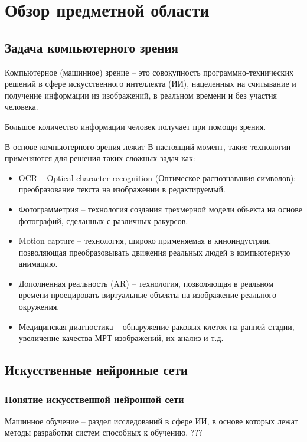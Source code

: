 \section{Обзор предметной области}
\subsection{Задача компьютерного зрения}
Компьютерное (машинное) зрение – это совокупность программно-технических решений в сфере искусственного интеллекта (ИИ), нацеленных на считывание и получение информации из изображений, в реальном времени и без участия человека. 

Большое количество информации человек получает при помощи зрения. 

В основе компьютерного зрения лежит 
В настоящий момент, такие технологии применяются для решения таких сложных задач как:
\begin{itemize}
    \item OCR – Optical character recognition (Оптическое распознавания символов): преобразование текста на изображении в редактируемый.
    \item Фотограмметрия – технология создания трехмерной модели объекта на основе фотографий, сделанных с различных ракурсов.
    \item Motion capture – технология, широко применяемая в киноиндустрии, позволяющая преобразовывать движения реальных людей в компьютерную анимацию.
    \item Дополненная реальность (AR) – технология, позволяющая в реальном времени проецировать виртуальные объекты на изображение реального окружения. 
    \item Медицинская диагностика – обнаружение раковых клеток на ранней стадии, увеличение качества МРТ изображений, их анализ и т.д.
\end{itemize}
\subsection{Искусственные нейронные сети}

\subsubsection{Понятие искусственной нейронной сети}

Машинное обучение – раздел исследований в сфере ИИ, в основе которых лежат методы разработки систем способных к обучению. ???

